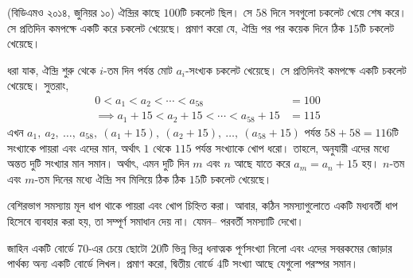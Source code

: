\begin{example}(বিডিএমও ২০১৪, জুনিয়র ১০)
	ঐন্দ্রির কাছে $100$টি চকলেট ছিল। সে $58$ দিনে সবগুলো চকলেট খেয়ে শেষ করে। সে প্রতিদিন কমপক্ষে একটি করে চকলেট খেয়েছে। প্রমাণ করো যে, ঐন্দ্রি পর পর কয়েক দিনে ঠিক $15$টি চকলেট খেয়েছে।
\end{example}
\begin{solution}
	ধরা যাক, ঐন্দ্রি শুরু থেকে $i$-তম দিন পর্যন্ত মোট $a_i$-সংখ্যক চকলেট খেয়েছে। সে প্রতিদিনই কমপক্ষে একটি চকলেট খেয়েছে। সুতরাং,
	\begin{align*}
		0<a_1 < a_2 < \cdots < a_{58}&=100 \\
		\implies a_1+15 < a_2+15<\cdots < a_{58}+15&=115
	\end{align*}
	এখন $a_1,\ a_2,\ \ldots,\ a_{58},\ (a_1+15),\ (a_2+15),\ \ldots,\ (a_{58}+15)$ পর্যন্ত $58+58=116$টি সংখ্যাকে পায়রা এবং এদের মান, অর্থাৎ $1$ থেকে $115$ পর্যন্ত সংখ্যাকে খোপ ধরো। তাহলে, \phpname{} অনুযায়ী এদের মধ্যে অন্তত দুটি সংখ্যার মান সমান। অর্থাৎ, এমন দুটি দিন $m$ এবং $n$ আছে যাতে করে $a_m = a_n+15$ হয়। $n$-তম এবং $m$-তম দিনের মধ্যে ঐন্দ্রি সব মিলিয়ে ঠিক ঠিক $15$টি চকলেট খেয়েছে।
\end{solution}

বেশিরভাগ সমস্যায় মূল ধাপ থাকে পায়রা এবং খোপ চিহ্নিত করা। আবার, কঠিন সমস্যাগুলোতে \phpname{} একটি মধ্যবর্তী ধাপ হিসেবে ব্যবহার করা হয়, তা সম্পূর্ণ সমাধান দেয় না। যেমন-- পরবর্তী সমস্যাটি দেখো।

\begin{example}
	জাহিন একটি বোর্ডে $70$-এর চেয়ে ছোটো $20$টি ভিন্ন ভিন্ন ধনাত্মক পূর্ণসংখ্যা নিলো এবং এদের সবরকমের জোড়ার পার্থক্য অন্য একটি বোর্ডে লিখল। প্রমাণ করো, দ্বিতীয় বোর্ডে $4$টি সংখ্যা আছে যেগুলো পরস্পর সমান।
\end{example}

